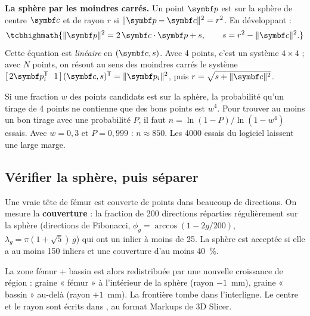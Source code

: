 
\textbf{La sphère par les moindres carrés.} Un point $\vb{p}$ est sur la sphère de centre $\vb{c}$ et de rayon $r$
si $\norm{\vb{p} - \vb{c}}^2 = r^2$. En développant :
\begin{equation}
  \tcbhighmath{\norm{\vb{p}}^2 = 2\,\vb{c}\cdot\vb{p} + s, \qquad s = r^2 - \norm{\vb{c}}^2.}
  \label{eq:sphere}
\end{equation}
Cette équation est \emph{linéaire} en $(\vb{c}, s)$. Avec 4 points, c'est un système $4 \times 4$ ; avec $N$ points,
on résout au sens des moindres carrés le système $[\,2\vb{p}_i^{\mathsf T}\ \ 1\,]\,(\vb{c}, s)^{\mathsf T} =
\norm{\vb{p}_i}^2$, puis $r = \sqrt{s + \norm{\vb{c}}^2}$.

\begin{exemple}[title={Exemple chiffré : combien d'essais ?}]
Si une fraction $w$ des points candidats est sur la sphère, la probabilité qu'un tirage de 4 points ne contienne que
des bons points est $w^4$. Pour trouver au moins un bon tirage avec une probabilité $P$, il faut
$n = \ln(1 - P) / \ln(1 - w^4)$ essais. Avec $w = 0{,}3$ et $P = 0{,}999$ : $n \approx 850$. Les 4000 essais du
logiciel laissent une large marge.
\end{exemple}

\subsection{Vérifier la sphère, puis séparer}

Une vraie tête de fémur est couverte de points dans beaucoup de directions. On mesure la \textbf{couverture} : la
fraction de 200 directions réparties régulièrement sur la sphère (directions de Fibonacci,
$\phi_g = \arccos(1 - 2g/200)$, $\lambda_g = \pi(1 + \sqrt5)\,g$) qui ont un inlier à moins de 25\degre. La sphère est
acceptée si elle a au moins 150 inliers et une couverture d'au moins 40~\%.

La zone fémur + bassin est alors redistribuée par une nouvelle croissance de région : graine « fémur » à l'intérieur de
la sphère (rayon $- 1$~mm), graine « bassin » au-delà (rayon $+ 1$~mm). La frontière tombe dans l'interligne. Le centre
et le rayon sont écrits dans , au format Markups de 3D Slicer.

